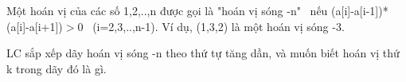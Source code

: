 Một hoán vị của các số 1,2,..,n được gọi là "hoán vị sóng -n"  nếu  (a[i]-a[i-1])*(a[i]-a[i+1])$>$0  (i=2,3,..,n-1). Ví dụ, (1,3,2) là một hoán vị sóng -3.  

   LC sắp xếp dãy hoán vị sóng -n theo thứ tự tăng dần, và muốn biết hoán vị thứ k trong dãy đó là gì.